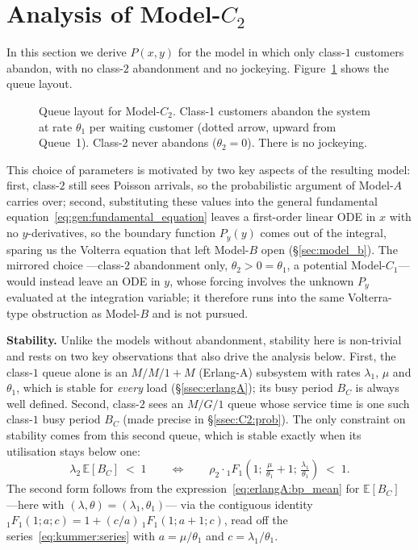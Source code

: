 \section{Analysis of Model-\texorpdfstring{$C_2$}{C2}}\label{sec:model_c2}

In this section we derive $P(x,y)$ for the model in which only class-$1$ customers abandon, with no class-$2$ abandonment and no jockeying. Figure~\ref{fig:model-c2-queue} shows the queue layout.
\begin{figure}[H]
    \centering
    \resizebox{0.62\textwidth}{!}{%
    }
    \caption{Queue layout for Model-$C_2$. Class-1 customers abandon the system
    at rate $\theta_1$ per waiting customer (dotted arrow, upward from Queue~1).
    Class-2 never abandons ($\theta_2=0$). There is no jockeying.}
    \label{fig:model-c2-queue}
\end{figure}
This choice of parameters is motivated by two key aspects of the resulting model: first, class-$2$ still sees Poisson arrivals, so the probabilistic argument of Model-$A$ carries over; second, substituting these values into the general fundamental equation~\eqref{eq:gen:fundamental_equation} leaves a first-order linear ODE in $x$ with no $y$-derivatives, so the boundary function $P_y(y)$ comes out of the integral, sparing us the Volterra equation that left Model-$B$ open (\S\ref{sec:model_b}). The mirrored choice ---class-$2$ abandonment only, $\theta_2>0=\theta_1$, a potential Model-$C_1$--- would instead leave an ODE in $y$, whose forcing involves the unknown $P_y$ evaluated at the integration variable; it therefore runs into the same Volterra-type obstruction as Model-$B$ and is not pursued.

\textbf{Stability.} Unlike the models without abandonment, stability here is non-trivial and rests on two key observations that also drive the analysis below. First, the class-$1$ queue alone is an $M/M/1{+}M$ (Erlang-A) subsystem with rates $\lambda_1$, $\mu$ and $\theta_1$, which is stable for \emph{every} load (\S\ref{ssec:erlangA}); its busy period $B_C$ is always well defined. Second, class-$2$ sees an $M/G/1$ queue whose service time is one such class-$1$ busy period $B_C$ (made precise in \S\ref{ssec:C2:prob}). The only constraint on stability comes from this second queue, which is stable exactly when its utilisation stays below one:
\begin{equation}
    \lambda_2\,\mathbb{E}[B_C] \;<\; 1
    \qquad\Longleftrightarrow\qquad
    \rho_2\cdot{}_1F_1\!\left(1;\,\tfrac{\mu}{\theta_1}+1;\,\tfrac{\lambda_1}{\theta_1}\right) \;<\; 1.
    \label{eq:C2:stability}
\end{equation}
The second form follows from the expression~\eqref{eq:erlangA:bp_mean} for $\mathbb{E}[B_C]$ ---here with $(\lambda,\theta)=(\lambda_1,\theta_1)$--- via the contiguous identity ${}_1F_1(1;a;c)=1+(c/a)\,{}_1F_1(1;a+1;c)$, read off the series~\eqref{eq:kummer:series} with $a=\mu/\theta_1$ and $c=\lambda_1/\theta_1$.

